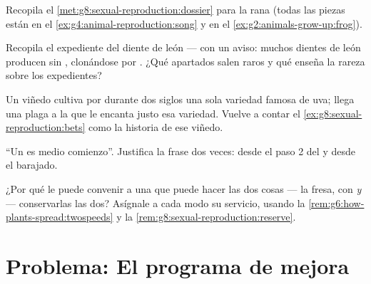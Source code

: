 \begin{exercise}[$\star\star$]\label{exo:g8:sexual-reproduction:8}
Recopila el \cref{met:g8:sexual-reproduction:dossier} para la rana
(todas las piezas están en el \cref{ex:g4:animal-reproduction:song} y
en el \cref{ex:g2:animals-grow-up:frog}).
\end{exercise}

\begin{exercise}[$\star\star$]\label{exo:g8:sexual-reproduction:9}
Recopila el expediente del diente de león --- con un aviso: muchos
dientes de león producen  sin , clonándose por
. ¿Qué apartados salen raros y qué enseña la rareza sobre los
expedientes?
\end{exercise}

\begin{exercise}[$\star\star$]\label{exo:g8:sexual-reproduction:10}
Un viñedo cultiva por  durante dos siglos una sola variedad
famosa de uva; llega una plaga a la que le encanta justo esa variedad.
Vuelve a contar el \cref{ex:g8:sexual-reproduction:bets} como la
historia de ese viñedo.
\end{exercise}

\begin{exercise}[$\star\star$]\label{exo:g8:sexual-reproduction:11}
``Un  es medio comienzo''. Justifica la frase dos veces: desde el
paso 2 del  y desde el barajado.
\end{exercise}

\begin{exercise}[$\star\star\star$]\label{exo:g8:sexual-reproduction:12}
¿Por qué le puede convenir a una  que puede hacer las dos cosas
--- la fresa, con  \emph{y}  --- conservarlas las dos?
Asígnale a cada modo su servicio, usando la
\cref{rem:g6:how-plants-spread:twospeeds} y la
\cref{rem:g8:sexual-reproduction:reserve}.
\end{exercise}

\section{Problema: El programa de mejora}

